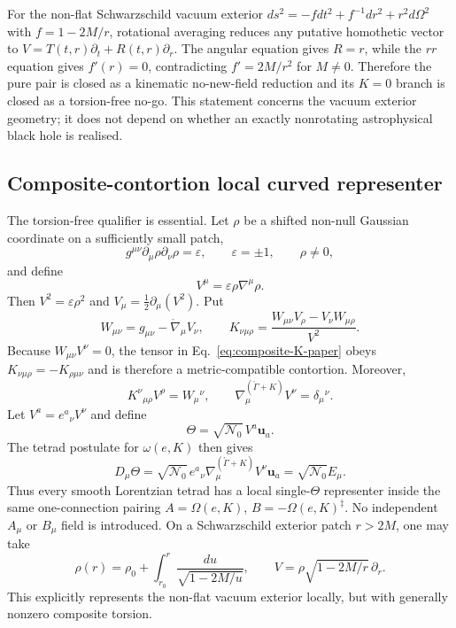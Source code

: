 \documentclass[12pt,a4paper]{article}
\theoremstyle{remark}\newtheorem{remark}[definition]{Remark}
\begin{document}
For the non-flat Schwarzschild vacuum exterior
$ds^2=-fdt^2+f^{-1}dr^2+r^2d\Omega^2$ with
$f=1-2M/r$, rotational averaging reduces any putative homothetic vector to
$V=T(t,r)\partial_t+R(t,r)\partial_r$.  The angular equation gives $R=r$,
while the $rr$ equation gives $f'(r)=0$, contradicting
$f'=2M/r^2$ for $M\ne0$.  Therefore the pure pair is closed as a kinematic
no-new-field reduction and its $K=0$ branch is closed as a torsion-free no-go.
This statement concerns the vacuum exterior geometry; it does not depend on
whether an exactly nonrotating astrophysical black hole is realised.

\subsection{Composite-contortion local curved representer}
The torsion-free qualifier is essential.  Let $\rho$ be a shifted non-null
Gaussian coordinate on a sufficiently small patch,
\begin{equation}
 g^{\mu\nu}\partial_\mu\rho\partial_\nu\rho=\varepsilon,
 \qquad \varepsilon=\pm1,
 \qquad \rho\ne0,
\end{equation}
and define
\begin{equation}
 V^\mu=\varepsilon\rho\nabla^\mu\rho.
\end{equation}
Then $V^2=\varepsilon\rho^2$ and
$V_\mu=\tfrac12\partial_\mu(V^2)$.  Put
\begin{equation}
 W_{\mu\nu}=g_{\mu\nu}-\mathring\nabla_\mu V_\nu,
 \qquad
 \boxed{K_{\nu\mu\rho}
 =\frac{W_{\mu\nu}V_\rho-V_\nu W_{\mu\rho}}{V^2}.}
 \label{eq:composite-K-paper}
\end{equation}
Because $W_{\mu\nu}V^\nu=0$, the tensor in
Eq.~\eqref{eq:composite-K-paper} obeys
$K_{\nu\mu\rho}=-K_{\rho\mu\nu}$ and is therefore a metric-compatible
contortion.  Moreover,
\begin{equation}
 K^\nu{}_{\mu\rho}V^\rho=W_\mu{}^\nu,
 \qquad
 \nabla^{(\mathring\Gamma+K)}_\mu V^\nu=\delta_\mu{}^\nu.
 \label{eq:torsionful-concurrent-paper}
\end{equation}
Let $V^a=e^a{}_{\nu}V^\nu$ and define
\begin{equation}
 \boxed{\Theta=\sqrt{\mathcal N_0}\,V^a\mathbf u_a.}
 \label{eq:torsionful-theta-paper}
\end{equation}
The tetrad postulate for $\omega(e,K)$ then gives
\begin{equation}
 D_\mu\Theta
 =\sqrt{\mathcal N_0}\,e^a{}_{\nu}
   \nabla^{(\mathring\Gamma+K)}_\mu V^\nu\mathbf u_a
 =\sqrt{\mathcal N_0}E_\mu.
\end{equation}
Thus every smooth Lorentzian tetrad has a local single-$\Theta$ representer
inside the same one-connection pairing
$A=\Omega(e,K)$, $B=-\Omega(e,K)^\ddagger$.  No independent $A_\mu$ or
$B_\mu$ field is introduced.  On a Schwarzschild exterior patch $r>2M$, one
may take
\begin{equation}
 \rho(r)=\rho_0+\int_{r_0}^{r}
 \frac{du}{\sqrt{1-2M/u}},
 \qquad
 V=\rho\sqrt{1-2M/r}\,\partial_r.
\end{equation}
This explicitly represents the non-flat vacuum exterior locally, but with
generally nonzero composite torsion.
\end{document}
